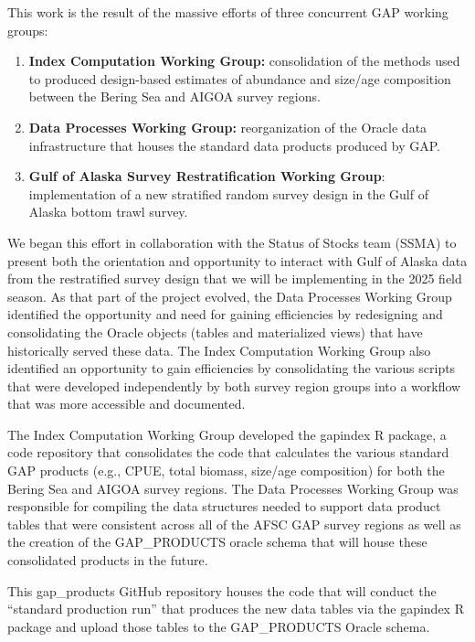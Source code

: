 \documentclass[
  letterpaper,
  oneside,
  open=any]{scrbook}
\begin{document}

This work is the result of the massive efforts of three concurrent GAP
working groups:

\begin{enumerate}
\def\labelenumi{(\arabic{enumi})}
\item
  \textbf{Index Computation Working Group:} consolidation of the methods
  used to produced design-based estimates of abundance and size/age
  composition between the Bering Sea and AIGOA survey regions.
\item
  \textbf{Data Processes Working Group:} reorganization of the Oracle
  data infrastructure that houses the standard data products produced by
  GAP.
\item
  \textbf{Gulf of Alaska Survey Restratification Working Group}:
  implementation of a new stratified random survey design in the Gulf of
  Alaska bottom trawl survey.
\end{enumerate}

We began this effort in collaboration with the Status of Stocks team
(SSMA) to present both the orientation and opportunity to interact with
Gulf of Alaska data from the restratified survey design that we will be
implementing in the 2025 field season. As that part of the project
evolved, the Data Processes Working Group identified the opportunity and
need for gaining efficiencies by redesigning and consolidating the
Oracle objects (tables and materialized views) that have historically
served these data. The Index Computation Working Group also identified
an opportunity to gain efficiencies by consolidating the various scripts
that were developed independently by both survey region groups into a
workflow that was more accessible and documented.

The Index Computation Working Group developed the gapindex R package, a
code repository that consolidates the code that calculates the various
standard GAP products (e.g., CPUE, total biomass, size/age composition)
for both the Bering Sea and AIGOA survey regions. The Data Processes
Working Group was responsible for compiling the data structures needed
to support data product tables that were consistent across all of the
AFSC GAP survey regions as well as the creation of the GAP\_PRODUCTS
oracle schema that will house these consolidated products in the future.

This gap\_products GitHub repository houses the code that will conduct
the ``standard production run'' that produces the new data tables via
the gapindex R package and upload those tables to the GAP\_PRODUCTS
Oracle schema.
\end{document}
